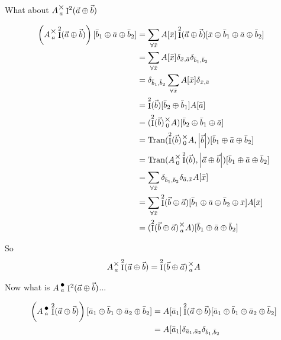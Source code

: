 \documentclass[12pt]{book}
\theoremstyle{plain}
\theoremstyle{definition}
\theoremstyle{ppart}
\theoremstyle{case}
\theoremstyle{solution}
\DeclareMathOperator{\Ident}{I}
\DeclareMathOperator{\Tran}{Tran}
\newcommand{\mmult}[1]{\text{\raisebox{1ex}{$\underset{#1}{\times}$}}}
\newcommand{\dmult}[1]{\text{\raisebox{1ex}{$\underset{#1}{\,\bullet\,}$}}}
\newcommand{\shape}[1]{\left|#1\right|}
\begin{document}
\begin{appendices}
What about $A \mmult{a} \Ident^2(\vec{a} \oplus \vec{b})$

\begin{align*}
\left(A \mmult{a} \Ident^2(\vec{a} \oplus \vec{b}) \right)[\bar{b}_1 \oplus \bar{a} \oplus \bar{b}_2]
  &= 
  \sum_{\forall \bar{x}}
    A[\bar{x}] \Ident^2(\vec{a} \oplus \vec{b})[\bar{x} \oplus \bar{b}_1 \oplus \bar{a} \oplus \bar{b}_2] \\
  &= 
  \sum_{\forall \bar{x}}
    A[\bar{x}] \delta_{\bar{x},\bar{a}} \delta_{\bar{b}_1,\bar{b}_2} \\
  &=
  \delta_{\bar{b}_1,\bar{b}_2}
  \sum_{\forall \bar{x}}
    A[\bar{x}] \delta_{\bar{x},\bar{a}} \\
  &=
  \Ident^2(\vec{b})[\bar{b}_2 \oplus \bar{b}_1]
  A[\bar{a}] \\
  &=
  (\Ident^2(\vec{b}) \mmult{0} A) [\bar{b}_2 \oplus \bar{b}_1 \oplus \bar{a}] \\
  &=
  \Tran(\Ident^2(\vec{b}) \mmult{0} A, \shape{\vec{b}})[\bar{b}_1 \oplus \bar{a} \oplus \bar{b}_2] \\
  &=
  \Tran(A \mmult{0} \Ident^2(\vec{b}), \shape{\vec{a} \oplus \vec{b}})[\bar{b}_1 \oplus \bar{a} \oplus \bar{b}_2] \\
  &= 
  \sum_{\forall \bar{x}}
    \delta_{\bar{b}_1,\bar{b}_2} \delta_{\bar{a},\bar{x}} A[\bar{x}] \\
  &= 
  \sum_{\forall \bar{x}}
    \Ident^2(\vec{b} \oplus \vec{a})[\bar{b}_1 \oplus \bar{a} \oplus \bar{b}_2 \oplus \bar{x}]
    A[\bar{x}] \\
  &= 
  (\Ident^2(\vec{b} \oplus \vec{a}) \mmult{a} A) [\bar{b}_1 \oplus \bar{a} \oplus \bar{b}_2]
\end{align*}

So
\[ A \mmult{a} \Ident^2(\vec{a} \oplus \vec{b}) = \Ident^2(\vec{b} \oplus \vec{a}) \mmult{a} A \]

Now what is $A \dmult{a} \Ident^2(\vec{a} \oplus \vec{b})$...

\begin{align*}
\left(A \dmult{a} \Ident^2(\vec{a} \oplus \vec{b})\right) [\bar{a}_1 \oplus \bar{b}_1 \oplus \bar{a}_2 \oplus \bar{b}_2]
  &=
  A [\bar{a}_1] \Ident^2(\vec{a} \oplus \vec{b}) [\bar{a}_1 \oplus \bar{b}_1 \oplus \bar{a}_2 \oplus \bar{b}_2] \\
  &=
  A [\bar{a}_1] \delta_{\bar{a}_1, \bar{a}_2} \delta_{\bar{b}_1, \bar{b}_2}
\end{align*}


\end{appendices}
\end{document}
